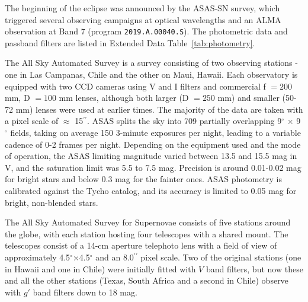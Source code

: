 \documentclass[sn-nature]{sn-jnl}%
\newcommand*\degr{\ensuremath{^\circ}}
\newcommand*\arcsec{\ensuremath{^{\prime\prime}}}
\begin{document}
The beginning of the eclipse was announced \cite{RizzoSmith21} by the ASAS-SN survey, which triggered several observing campaigns at optical wavelengths and an ALMA observation at Band 7 (program \texttt{2019.A.00040.S}).
%
The photometric data and passband filters are listed in Extended Data Table~\ref{tab:photometry}.



%
%
The All Sky Automated Survey \cite[ASAS; ][]{pojmanski_all_1997, asas_2005, asas_2018} is a survey consisting of two observing stations - one in Las Campanas, Chile and the other on Maui, Hawaii. 
%
Each observatory is equipped with two CCD cameras using V and I filters and commercial f $ = 200$ mm, D $= 100$ mm lenses, although both larger (D $=250$ mm) and smaller (50-72 mm) lenses were used at earlier times.
%
The majority of the data are taken with a pixel scale of $\approx$ 15\arcsec{}.
%
ASAS splits the sky into 709 partially overlapping 9\degr{} $\times$ 9\degr{} fields, taking on average 150 3-minute exposures per night, leading to a variable cadence of 0-2 frames per night.
%
Depending on the equipment used and the mode of operation, the ASAS limiting magnitude varied between 13.5 and 15.5 mag in V, and the saturation limit was 5.5 to 7.5 mag. 
%
Precision is around 0.01-0.02 mag for bright stars and below 0.3 mag for the fainter ones. 
%
ASAS photometry is calibrated against the Tycho catalog, and its accuracy is limited to 0.05 mag for bright, non-blended stars.


The All Sky Automated Survey for Supernovae \cite[ASAS-SN; ][]{shappee_man_2014,kochanek_all-sky_2017} consists of five stations around the globe, with each station hosting four telescopes with a shared mount.
%
The telescopes consist of a 14-cm aperture telephoto lens with a field of view of approximately 4.5\degr{}$\times$4.5\degr{} and an 8.0\arcsec{} pixel scale.
% 
Two of the original stations (one in Hawaii and one in Chile) were initially fitted with $V$ band filters, but now these and all the other stations (Texas, South Africa and a second in Chile) observe with $g'$ band filters down to 18 mag.
\end{document}

